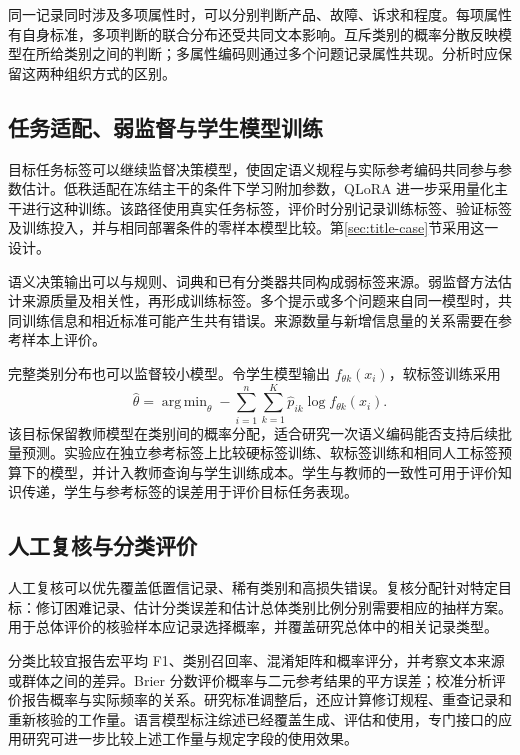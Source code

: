 \documentclass[UTF8,a4paper,zihao=-4,fontset=fandol]{ctexart}
\DeclareMathOperator*{\argmin}{arg\,min}
\begin{document}
同一记录同时涉及多项属性时，可以分别判断产品、故障、诉求和程度。每项属性有自身标准，多项判断的联合分布还受共同文本影响。互斥类别的概率分散反映模型在所给类别之间的判断；多属性编码则通过多个问题记录属性共现。分析时应保留这两种组织方式的区别。

\subsection{任务适配、弱监督与学生模型训练}

目标任务标签可以继续监督决策模型，使固定语义规程与实际参考编码共同参与参数估计。低秩适配在冻结主干的条件下学习附加参数，QLoRA 进一步采用量化主干进行这种训练\citep{qlora2023}。该路径使用真实任务标签，评价时分别记录训练标签、验证标签及训练投入，并与相同部署条件的零样本模型比较。第\ref{sec:title-case}节采用这一设计。

语义决策输出可以与规则、词典和已有分类器共同构成弱标签来源。弱监督方法估计来源质量及相关性，再形成训练标签\citep{ratner2017}。多个提示或多个问题来自同一模型时，共同训练信息和相近标准可能产生共有错误。来源数量与新增信息量的关系需要在参考样本上评价。

完整类别分布也可以监督较小模型。令学生模型输出 $f_{\theta k}(x_i)$，软标签训练采用
\begin{equation}
 \widehat\theta=\argmin_\theta
 -\sum_{i=1}^n\sum_{k=1}^K\widehat p_{ik}\log f_{\theta k}(x_i).
 \label{eq:student}
\end{equation}
该目标保留教师模型在类别间的概率分配，适合研究一次语义编码能否支持后续批量预测。实验应在独立参考标签上比较硬标签训练、软标签训练和相同人工标签预算下的模型，并计入教师查询与学生训练成本。学生与教师的一致性可用于评价知识传递，学生与参考标签的误差用于评价目标任务表现。

\subsection{人工复核与分类评价}

人工复核可以优先覆盖低置信记录、稀有类别和高损失错误。复核分配针对特定目标：修订困难记录、估计分类误差和估计总体类别比例分别需要相应的抽样方案。用于总体评价的核验样本应记录选择概率，并覆盖研究总体中的相关记录类型。

分类比较宜报告宏平均 F1、类别召回率、混淆矩阵和概率评分，并考察文本来源或群体之间的差异。Brier 分数评价概率与二元参考结果的平方误差；校准分析评价报告概率与实际频率的关系\citep{guo2017}。研究标准调整后，还应计算修订规程、重查记录和重新核验的工作量。语言模型标注综述已经覆盖生成、评估和使用\citep{tan2024}，专门接口的应用研究可进一步比较上述工作量与规定字段的使用效果。
\end{document}
